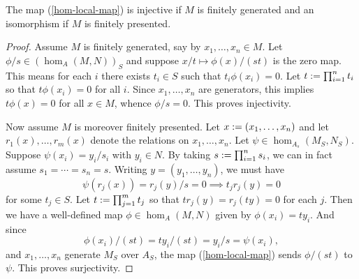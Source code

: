 \begin{proposition}
  The map (\ref{hom-local-map}) is injective if $M$ is finitely
  generated and an isomorphism if $M$ is finitely presented.
\end{proposition}

\begin{proof}
  Assume $M$ is finitely generated, say by $x_1,\ldots,x_n \in M$. Let
  $\phi/s \in (\hom_A(M,N))_S$ and suppose $x/t \mapsto \phi(x)/(st)$
  is the zero map. This means for each $i$ there exists $t_i \in S$
  such that $t_i\phi(x_i) = 0$. Let $t \mathrel{:=} \prod_{i=1}^n t_i$ so that
  $t\phi(x_i) = 0$ for all $i$. Since $x_1,\ldots,x_n$ are generators,
  this implies $t\phi(x) = 0$ for all $x \in M$, whence $\phi/s =
  0$. This proves injectivity.

  Now assume $M$ is moreover finitely presented. Let $x \mathrel{:=}
  (x_1,\ldots,x_n)$ and let $r_1(x),\ldots,r_m(x)$ denote the
  relations on $x_1,\ldots,x_n$. Let $\psi \in
  \hom_{A_s}(M_S,N_S)$. Suppose $\psi(x_i) = y_i/s_i$ with $y_i \in
  N$. By taking $s \mathrel{:=} \prod_{i=1}^n s_i$, we can in fact assume $s_1
  = \cdots = s_n = s$. Writing $y = (y_1,\ldots,y_n)$, we must have
  \[
  \psi(r_j(x)) = r_j(y)/s = 0 \implies t_jr_j(y) = 0
  \]
  for some $t_j \in S$. Let $t \mathrel{:=} \prod_{j=1}^m t_j$ so that $tr_j(y)
  = r_j(ty) = 0$ for each $j$. Then we have a well-defined map $\phi
  \in \hom_A(M,N)$ given by $\phi(x_i) = ty_i$. And since
  \[
  \phi(x_i)/(st) = ty_i/(st) = y_i/s = \psi(x_i),
  \]
  and $x_1,\ldots,x_n$ generate $M_S$ over $A_S$, the map
  (\ref{hom-local-map}) sends $\phi/(st)$ to $\psi$. This proves
  surjectivity.
\end{proof}








